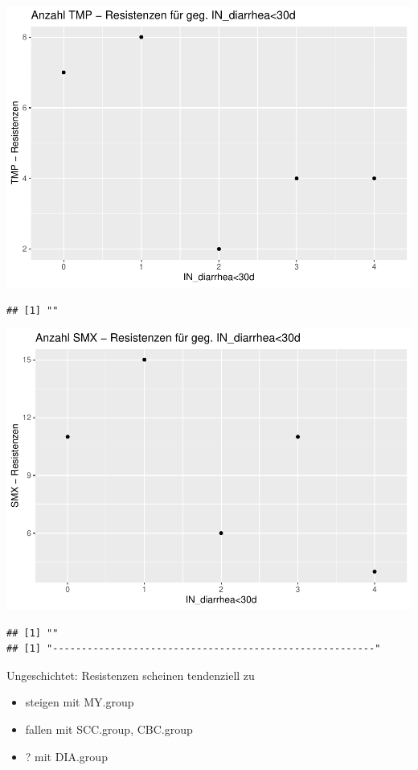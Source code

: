 \documentclass[
]{article}
\providecommand{\tightlist}{%
  \setlength{\itemsep}{0pt}\setlength{\parskip}{0pt}}
\begin{document}
\includegraphics{NResistenzen_files/figure-latex/unnamed-chunk-6-39.pdf}

\begin{verbatim}
## [1] ""
\end{verbatim}

\includegraphics{NResistenzen_files/figure-latex/unnamed-chunk-6-40.pdf}

\begin{verbatim}
## [1] ""
## [1] "--------------------------------------------------------"
\end{verbatim}

Ungeschichtet: Resistenzen scheinen tendenziell zu

\begin{itemize}
\tightlist
\item
  steigen mit MY.group
\item
  fallen mit SCC.group, CBC.group
\item
  ? mit DIA.group
\end{itemize}
\end{document}
